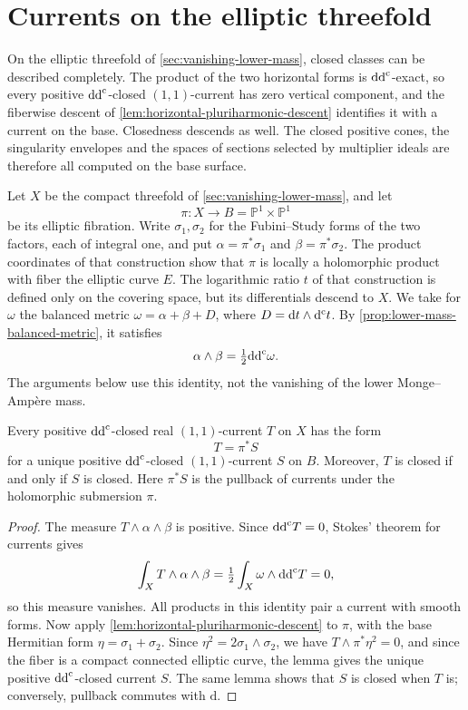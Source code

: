 \section{Currents on the elliptic threefold}
\label{sec:elliptic-closed-current-descent}\label{subsec:elliptic-current-descent}

On the elliptic threefold of \cref{sec:vanishing-lower-mass}, closed classes can be described completely. The product of the two horizontal forms is $\mathrm{dd}^{\mathrm{c}}$-exact, so every positive $\mathrm{dd}^{\mathrm{c}}$-closed $(1,1)$-current has zero vertical component, and the fiberwise descent of \cref{lem:horizontal-pluriharmonic-descent} identifies it with a current on the base. Closedness descends as well. The closed positive cones, the singularity envelopes and the spaces of sections selected by multiplier ideals are therefore all computed on the base surface.

Let $X$ be the compact threefold of \cref{sec:vanishing-lower-mass}, and let
\[
 \pi\colon X\longrightarrow B=\mathbb P^1\times\mathbb P^1
\]
be its elliptic fibration. Write $\sigma_1,\sigma_2$ for the Fubini--Study forms of the two factors, each of integral one, and put $\alpha=\pi^*\sigma_1$ and $\beta=\pi^*\sigma_2$. The product coordinates of that construction show that $\pi$ is locally a holomorphic product with fiber the elliptic curve $E$. The logarithmic ratio $t$ of that construction is defined only on the covering space, but its differentials descend to $X$. We take for $\omega$ the balanced metric $\omega=\alpha+\beta+D$, where $D=\mathrm{d}t\wedge\mathrm d^{\mathrm c} t$. By \cref{prop:lower-mass-balanced-metric}, it satisfies
\[
 \alpha\wedge\beta=\tfrac12\mathrm{dd}^{\mathrm{c}}\omega.
\]
The arguments below use this identity, not the vanishing of the lower Monge--Amp\`ere mass.

\begin{lemma}\label{lem:elliptic-positive-current-descent}
Every positive $\mathrm{dd}^{\mathrm{c}}$-closed real $(1,1)$-current $T$ on $X$ has the form
\[
 T=\pi^*S
\]
for a unique positive $\mathrm{dd}^{\mathrm{c}}$-closed $(1,1)$-current $S$ on $B$. Moreover, $T$ is closed if and only if $S$ is closed. Here $\pi^*S$ is the pullback of currents under the holomorphic submersion $\pi$.
\end{lemma}
\begin{proof}
The measure $T\wedge\alpha\wedge\beta$ is positive. Since $\mathrm{dd}^{\mathrm{c}} T=0$, Stokes' theorem for currents gives
\[
 \int_XT\wedge\alpha\wedge\beta
   =\tfrac12\int_X\omega\wedge\mathrm{dd}^{\mathrm{c}} T=0,
\]
so this measure vanishes. All products in this identity pair a current with smooth forms. Now apply \cref{lem:horizontal-pluriharmonic-descent} to $\pi$, with the base Hermitian form $\eta=\sigma_1+\sigma_2$. Since $\eta^2=2\sigma_1\wedge\sigma_2$, we have $T\wedge\pi^*\eta^2=0$, and since the fiber is a compact connected elliptic curve, the lemma gives the unique positive $\mathrm{dd}^{\mathrm{c}}$-closed current $S$. The same lemma shows that $S$ is closed when $T$ is; conversely, pullback commutes with $\mathrm{d}$.
\end{proof}

